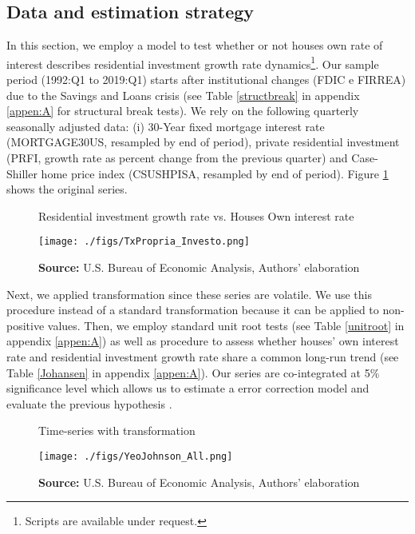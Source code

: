 \documentclass[12pt, a4paper]{article}
\begin{document}
\subsection{Data and estimation strategy}
\label{sec:orgf9d02c1}
\label{sec:estimation}


In this section, we employ a model to test whether or not houses own rate of interest describes residential investment growth rate dynamics\footnote{Scripts are available under request.}.
Our sample period (1992:Q1 to 2019:Q1) starts after institutional changes (FDIC e
FIRREA) due to the Savings and Loans crisis (see Table \ref{structbreak} in appendix \ref{appen:A} for structural break tests).
We rely on the following  quarterly seasonally adjusted data: (i) 30-Year fixed mortgage interest rate (MORTGAGE30US, resampled by end of period), private residential investment (PRFI, growth rate as percent change from the previous quarter) and Case-Shiller home price index
(CSUSHPISA, resampled by end of period). Figure \ref{propria_investo}  shows the original series.

\begin{figure}[htb]
	\centering
	\caption{Residential investment growth rate vs. Houses Own interest rate}
	\label{propria_investo}
	\texttt{[image: ./figs/TxPropria\_Investo.png]}
	\caption*{\textbf{Source:} U.S. Bureau of Economic Analysis, Authors' elaboration}
\end{figure}


Next, we applied \textcite{yeo_new_2000} transformation since these series are volatile. We use this procedure instead of a standard \textcite{box_analysis_1964} transformation  because it can be applied to non-positive values.
Then, we employ standard unit root tests (see Table \ref{unitroot} in appendix \ref{appen:A}) as well as \textcite{johansen_estimation_1991} procedure to assess whether houses' own interest rate and residential investment growth rate share a common long-run trend (see Table \ref{Johansen} in appendix \ref{appen:A}).
Our series are co-integrated at 5\% significance level which allows us to estimate a error correction model and evaluate the previous hypothesis \cite{enders_applied_2014}.

\begin{figure}[htb]
	\centering
	\caption{Time-series with \textcite{yeo_new_2000} transformation}
	\label{YeoJhonson}
	\texttt{[image: ./figs/YeoJohnson\_All.png]}
	\caption*{\textbf{Source:} U.S. Bureau of Economic Analysis, Authors' elaboration}
\end{figure}
\end{document}
